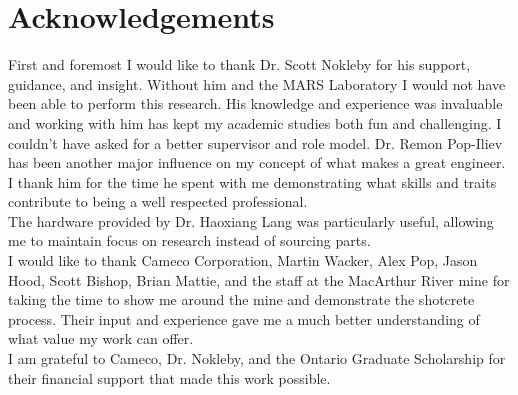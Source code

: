 \chapter*{Acknowledgements}
First and foremost I would like to thank Dr. Scott Nokleby for his support, guidance, and insight. Without him and the MARS Laboratory I would not have been able to perform this research. His knowledge and experience was invaluable and working with him has kept my academic studies both fun and challenging. I couldn't have asked for a better supervisor and role model. Dr. Remon Pop-Iliev has been another major influence on my concept of what makes a great engineer. I thank him for the time he spent with me demonstrating what skills and traits contribute to being a well respected professional.\\

The hardware provided by Dr. Haoxiang Lang was particularly useful, allowing me to maintain focus on research instead of sourcing parts.\\

I would like to thank Cameco Corporation, Martin Wacker, Alex Pop, Jason Hood, Scott Bishop, Brian Mattie, and the staff at the MacArthur River mine for taking the time to show me around the mine and demonstrate the shotcrete process. Their input and experience gave me a much better understanding of what value my work can offer.\\

I am grateful to Cameco, Dr. Nokleby, and the Ontario Graduate Scholarship for their financial support that made this work possible.\\



